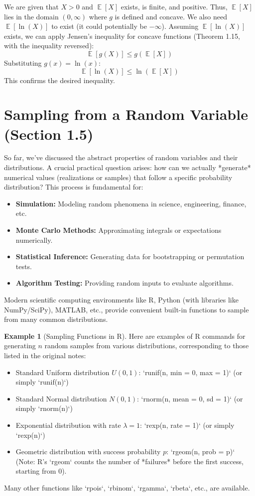 \documentclass[11pt]{article}
\theoremstyle{definition}
\newtheorem{example}[theorem]{Example}
\theoremstyle{remark}
\DeclareMathOperator{\E}{\mathbb{E}} %
\begin{document}
We are given that $X > 0$ and $\E[X]$ exists, is finite, and positive. Thus, $\E[X]$ lies in the domain $(0, \infty)$ where $g$ is defined and concave. We also need $\E[\ln(X)]$ to exist (it could potentially be $-\infty$). Assuming $\E[\ln(X)]$ exists, we can apply Jensen's inequality for concave functions (Theorem 1.15, with the inequality reversed):
\[ \E[g(X)] \le g(\E[X]) \]
Substituting $g(x) = \ln(x)$:
\[ \E[\ln(X)] \le \ln(\E[X]) \]
This confirms the desired inequality.
\hrulefill


\section{Sampling from a Random Variable (Section 1.5)}

So far, we've discussed the abstract properties of random variables and their distributions. A crucial practical question arises: how can we actually *generate* numerical values (realizations or samples) that follow a specific probability distribution? This process is fundamental for:
\begin{itemize}
    \item \textbf{Simulation:} Modeling random phenomena in science, engineering, finance, etc.
    \item \textbf{Monte Carlo Methods:} Approximating integrals or expectations numerically.
    \item \textbf{Statistical Inference:} Generating data for bootstrapping or permutation tests.
    \item \textbf{Algorithm Testing:} Providing random inputs to evaluate algorithms.
\end{itemize}

Modern scientific computing environments like R, Python (with libraries like NumPy/SciPy), MATLAB, etc., provide convenient built-in functions to sample from many common distributions.

\begin{example}[Sampling Functions in R]
Here are examples of R commands for generating $n$ random samples from various distributions, corresponding to those listed in the original notes:
\begin{itemize}
    \item Standard Uniform distribution $U(0, 1)$: `runif(n, min = 0, max = 1)` (or simply `runif(n)`)
    \item Standard Normal distribution $N(0, 1)$: `rnorm(n, mean = 0, sd = 1)` (or simply `rnorm(n)`)
    \item Exponential distribution with rate $\lambda=1$: `rexp(n, rate = 1)` (or simply `rexp(n)`)
    \item Geometric distribution with success probability $p$: `rgeom(n, prob = p)` (Note: R's `rgeom` counts the number of *failures* before the first success, starting from 0).
\end{itemize}
Many other functions like `rpois`, `rbinom`, `rgamma`, `rbeta`, etc., are available.
\end{example}
\end{document}
